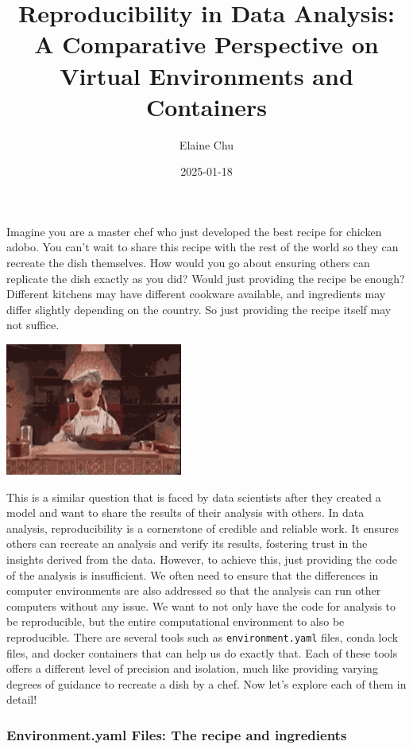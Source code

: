 \documentclass[
  letterpaper,
  DIV=11,
  numbers=noendperiod]{scrartcl}
\title{Reproducibility in Data Analysis: A Comparative Perspective on
Virtual Environments and Containers}
\author{Elaine Chu}
\date{2025-01-18}
\begin{document}
\maketitle


Imagine you are a master chef who just developed the best recipe for
chicken adobo. You can't wait to share this recipe with the rest of the
world so they can recreate the dish themselves. How would you go about
ensuring others can replicate the dish exactly as you did? Would just
providing the recipe be enough? Different kitchens may have different
cookware available, and ingredients may differ slightly depending on the
country. So just providing the recipe itself may not suffice.

\includegraphics{chef.gif}

This is a similar question that is faced by data scientists after they
created a model and want to share the results of their analysis with
others. In data analysis, reproducibility is a cornerstone of credible
and reliable work. It ensures others can recreate an analysis and verify
its results, fostering trust in the insights derived from the data.
However, to achieve this, just providing the code of the analysis is
insufficient. We often need to ensure that the differences in computer
environments are also addressed so that the analysis can run other
computers without any issue. We want to not only have the code for
analysis to be reproducible, but the entire computational environment to
also be reproducible. There are several tools such as
\texttt{environment.yaml} files, conda lock files, and docker containers
that can help us do exactly that. Each of these tools offers a different
level of precision and isolation, much like providing varying degrees of
guidance to recreate a dish by a chef. Now let's explore each of them in
detail!

\subsubsection{Environment.yaml Files: The recipe and
ingredients}\label{environment.yaml-files-the-recipe-and-ingredients}
\end{document}
